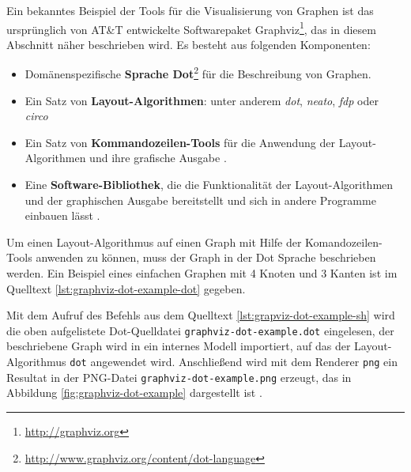 Ein bekanntes Beispiel der Tools für die Visualisierung von Graphen ist das ursprünglich von AT\&T entwickelte Softwarepaket Graphviz\footnote{\url{http://graphviz.org}}, das in diesem Abschnitt näher beschrieben wird. Es besteht aus folgenden Komponenten:

\begin{itemize}
    \item Domänenspezifische \textbf{Sprache Dot}\footnote{\url{http://www.graphviz.org/content/dot-language}} für die Beschreibung von Graphen.
    \item Ein Satz von \textbf{Layout-Algorithmen}: unter anderem \textit{dot}, \textit{neato}, \textit{fdp} oder \textit{circo} \cite{Gansner14Using, NorthGansner14Dot-Manual}
    \item Ein Satz von \textbf{Kommandozeilen-Tools} für die Anwendung der Layout-Algorithmen und ihre grafische Ausgabe \cite{NorthGansner14Dot-Manual}.
    \item Eine \textbf{Software-Bibliothek}, die die Funktionalität der Layout-Algorithmen und der graphischen Ausgabe bereitstellt und sich in andere Programme einbauen lässt \cite{Gansner14Using}.
\end{itemize}

Um einen Layout-Algorithmus auf einen Graph mit Hilfe der Komandozeilen-Tools anwenden zu können, muss der Graph in der Dot Sprache beschrieben werden. Ein Beispiel eines einfachen Graphen mit 4 Knoten und 3 Kanten ist im Quelltext \ref{lst:graphviz-dot-example-dot} gegeben.



Mit dem Aufruf des Befehls aus dem Quelltext \ref{lst:grapviz-dot-example-sh} wird die oben aufgelistete Dot-Quelldatei \lstinline{graphviz-dot-example.dot} eingelesen, der beschriebene Graph wird in ein internes Modell importiert, auf das der Layout-Algorithmus \lstinline{dot} angewendet wird. Anschließend wird mit dem Renderer \lstinline{png} ein Resultat in der PNG-Datei \lstinline{graphviz-dot-example.png} erzeugt, das in Abbildung \ref{fig:graphviz-dot-example} dargestellt ist \cite{Gansner14Using}.



